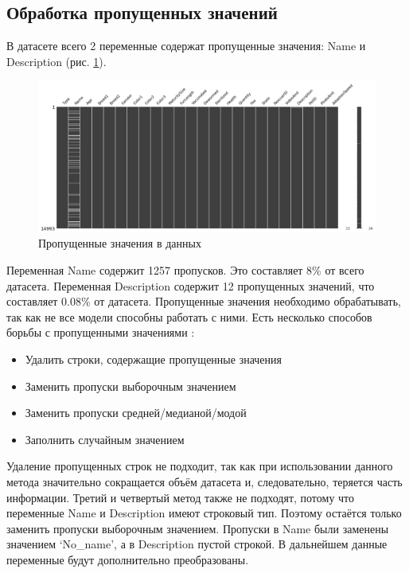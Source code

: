 \documentclass[14pt]{mmcs_article}
\begin{document}
\subsection{Обработка пропущенных значений}

В датасете всего 2 переменные содержат пропущенные значения: Name и Description (рис. \ref{analyse:empty}). 

\begin{figure}[H]
	\centering
	\includegraphics[scale=0.5]{empty.png}
	\caption{Пропущенные значения в данных}\label{analyse:empty}
\end{figure}

Переменная Name содержит 1257 пропусков. Это составляет 8\% от всего датасета. Переменная Description содержит 12 пропущенных значений, что составляет 0.08\% от датасета.
Пропущенные значения необходимо обрабатывать, так как не все модели способны работать с ними. Есть несколько способов борьбы с пропущенными значениями \cite{lib:missingdata}:
\begin{itemize}
	\item Удалить строки, содержащие пропущенные значения
	\item Заменить пропуски выборочным значением
	\item Заменить пропуски средней/медианой/модой
	\item Заполнить случайным значением
\end{itemize}

Удаление пропущенных строк не подходит, так как при использовании данного метода значительно сокращается объём датасета и, следовательно, теряется часть информации. Третий и четвертый метод также не подходят, потому что переменные Name и Description имеют строковый тип. Поэтому остаётся только заменить пропуски выборочным значением. 
Пропуски в Name были заменены значением `No\_name', а в Description пустой строкой. В дальнейшем данные переменные будут дополнительно преобразованы.
\end{document}
